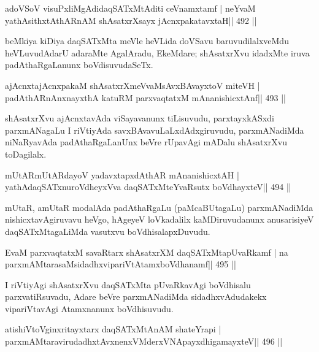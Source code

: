 \begin{shl}
adoVSoV visuPxliMgAdidaqSATxMtAditi ceVnamxtamf |
neYvaM yathAsithxtAthARnAM shAsatxrXsayx jAcnxpakatavxtaH\hfill || 492 ||
\end{shl}

\begin{artha}
beMkiya kiDiya daqSATxMta meVle heVLida doVSavu baruvudilalxveMdu heVLuvudAdarU adaraMte AgalAradu, EkeMdare; shAsatxrXvu idadxMte iruva padAthaRgaLanunx boVdisuvudaSeTx.
\end{artha}



\begin{shl}
ajAcnxtajAcnxpakaM shAsatxrXmeVvaMsAvxBAvayxtoV miteVH |
padAthARnAnxnayxthA katuRM parxvaqtatxM mAnanishicxtAnf\hfill || 493 ||
\end{shl}

\begin{artha}
shAsatxrXvu ajAcnxtavAda viSayavanunx tiLisuvudu, parxtayxkASxdi parxmANagaLu I riVtiyAda savxBAvavuLaLxdAdxgiruvudu, parxmANadiMda niNaRyavAda padAthaRgaLanUnx beVre rUpavAgi mADalu shAsatxrXvu toDagilalx.
\end{artha}

\begin{shl}
mUtARmUtARdayoV yadavxtapxdAthAR mAnanishicxtAH |
yathAdaqSATxnuroVdheyxVva daqSATxMteYvaRsutx boVdhayxteV\hfill || 494 ||
\end{shl}

\begin{artha}
mUtaR, amUtaR modalAda padAthaRgaLu (paMcaBUtagaLu) parxmANadiMda nishicxtavAgiruvavu heVgo, hAgeyeV loVkadalilx kaMDiruvudanunx anusarisiyeV daqSATxMtagaLiMda vasutxvu boVdhisalapxDuvudu.
\end{artha}

\begin{shl}
EvaM parxvaqtatxM savaRtarx shAsatxrXM daqSATxMtapUvaRkamf |
na parxmAMtarasaMsidadhxvipariVtAtamxboVdhanamf\hfill || 495 ||
\end{shl}

\begin{artha}
I riVtiyAgi shAsatxrXvu daqSATxMta pUvaRkavAgi boVdhisalu
parxvatiRsuvadu, Adare beVre parxmANadiMda sidadhxvAdudakekx
vipariVtavAgi Atamxnanunx boVdhisuvudu.
\end{artha}

\begin{shl}
atishiVtoV\s ginxritayxtarx daqSATxMtAnAM shateYrapi |
parxmAMtaravirudadhxtAvxnenxVMderxVNApayxdhigamayxteV\hfill || 496 ||
\end{shl}

